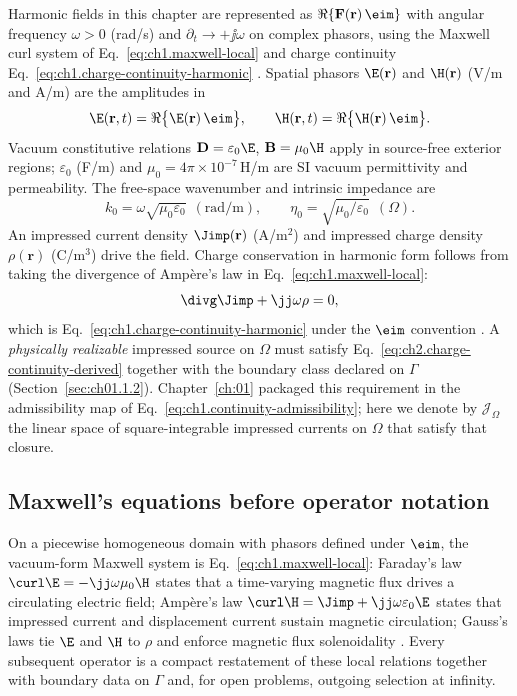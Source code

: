 Harmonic fields in this chapter are represented as $\Re\{\mathbf{F}(\mathbf{r})\,\eim\}$ with angular frequency $\omega>0$ (rad/s) and $\partial_t\to+\jj\omega$ on complex phasors, using the Maxwell curl system of Eq.~\eqref{eq:ch1.maxwell-local} and charge continuity Eq.~\eqref{eq:ch1.charge-continuity-harmonic} \cite{stratton1941}. Spatial phasors $\E(\mathbf{r})$ and $\H(\mathbf{r})$ (V/m and A/m) are the amplitudes in
\begin{equation}
\label{eq:ch2.real-time-fields}
\E(\mathbf{r},t)=\Re\big\{\E(\mathbf{r})\,\eim\big\},
\qquad
\H(\mathbf{r},t)=\Re\big\{\H(\mathbf{r})\,\eim\big\}.
\end{equation}
Vacuum constitutive relations $\mathbf{D}=\varepsilon_0\E$, $\mathbf{B}=\mu_0\H$ apply in source-free exterior regions; $\varepsilon_0$ (F/m) and $\mu_0=4\pi\times10^{-7}$\,H/m are SI vacuum permittivity and permeability. The free-space wavenumber and intrinsic impedance are
\begin{equation}
\label{eq:ch2.k0-eta0}
k_0=\omega\sqrt{\mu_0\varepsilon_0}\ \ (\mathrm{rad/m}),
\qquad
\eta_0=\sqrt{\mu_0/\varepsilon_0}\ \ (\Omega).
\end{equation}
An impressed current density $\Jimp(\mathbf{r})$ (A/m$^2$) and impressed charge density $\rho(\mathbf{r})$ (C/m$^3$) drive the field. Charge conservation in harmonic form follows from taking the divergence of Amp\`ere's law in Eq.~\eqref{eq:ch1.maxwell-local}:
\begin{equation}
\label{eq:ch2.charge-continuity-derived}
\divg\Jimp+\jj\omega\rho=0,
\end{equation}
which is Eq.~\eqref{eq:ch1.charge-continuity-harmonic} under the $\eim$ convention \cite{maxwell1873}. A \emph{physically realizable} impressed source on $\Omega$ must satisfy Eq.~\eqref{eq:ch2.charge-continuity-derived} together with the boundary class declared on $\Gamma$ (Section~\ref{sec:ch01.1.2}). Chapter~\ref{ch:01} packaged this requirement in the admissibility map of Eq.~\eqref{eq:ch1.continuity-admissibility}; here we denote by $\mathcal{J}_\Omega$ the linear space of square-integrable impressed currents on $\Omega$ that satisfy that closure.

\subsection{Maxwell's equations before operator notation}
\label{sec:ch02.1.1b}

On a piecewise homogeneous domain with phasors defined under $\eim$, the vacuum-form Maxwell system is Eq.~\eqref{eq:ch1.maxwell-local}: Faraday's law $\curl\E=-\jj\omega\mu_0\H$ states that a time-varying magnetic flux drives a circulating electric field; Amp\`ere's law $\curl\H=\Jimp+\jj\omega\varepsilon_0\E$ states that impressed current and displacement current sustain magnetic circulation; Gauss's laws tie $\E$ and $\H$ to $\rho$ and enforce magnetic flux solenoidality \cite{maxwell1873,stratton1941}. Every subsequent operator is a compact restatement of these local relations together with boundary data on $\Gamma$ and, for open problems, outgoing selection at infinity.

